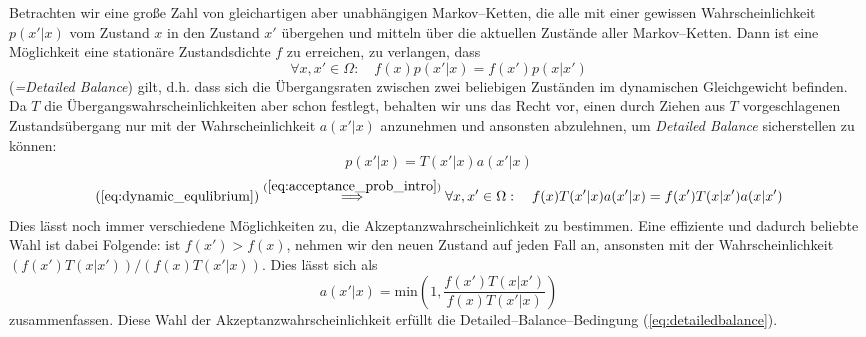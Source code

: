 	Betrachten wir eine große Zahl von gleichartigen aber unabhängigen Markov--Ketten, die alle mit einer gewissen Wahrscheinlichkeit $p(x'|x)$ vom Zustand $x$ in den Zustand $x'$ übergehen und mitteln über die aktuellen Zustände aller Markov--Ketten. Dann ist eine Möglichkeit eine stationäre Zustandsdichte $f$ zu erreichen, zu verlangen, dass
	\begin{equation}
		\forall x,x' \in \Omega :\quad f(x)p(x'|x) = f(x')p(x|x')
		\label{eq:dynamic_equlibrium}
	\end{equation}
	({\em =Detailed Balance}) gilt, d.h. dass sich die Übergangsraten zwischen zwei beliebigen Zuständen im dynamischen Gleichgewicht befinden.
	Da $T$ die Übergangswahrscheinlichkeiten aber schon festlegt, behalten wir uns das Recht vor, einen durch Ziehen aus $T$ vorgeschlagenen Zustandsübergang nur mit der Wahrscheinlichkeit $a(x'|x)$ anzunehmen und ansonsten abzulehnen,	um {\em Detailed Balance} sicherstellen zu können:
	\begin{equation}
		p(x'|x) = T(x'|x)a(x'|x)
		\label{eq:acceptance_prob_intro}
	\end{equation}
	\begin{equation}
		(\ref{eq:dynamic_equlibrium}) \stackrel{(\ref{eq:acceptance_prob_intro})}{\Longrightarrow}
		\forall x,x' \in \Omega :\quad f(x)T(x'|x)a(x'|x) = f(x')T(x|x')a(x|x')
		\label{eq:detailedbalance}
	\end{equation}
	Dies lässt noch immer verschiedene Möglichkeiten zu, die Akzeptanzwahrscheinlichkeit zu bestimmen. Eine effiziente und dadurch beliebte Wahl ist dabei Folgende: ist $f(x')>f(x)$, nehmen wir den neuen Zustand auf jeden Fall an, ansonsten mit der Wahrscheinlichkeit $(f(x')T(x|x'))/(f(x)T(x'|x))$. Dies lässt sich als
	\begin{equation}
		a(x'|x)=\text{min}\left(1,\frac{f(x')T(x|x')}{f(x)T(x'|x)}\right)
		\label{eq:acceptanceratio}
	\end{equation}
	zusammenfassen.
	Diese Wahl der Akzeptanzwahrscheinlichkeit erfüllt die Detailed--Balance--Bedingung (\ref{eq:detailedbalance}).
	
	
	
